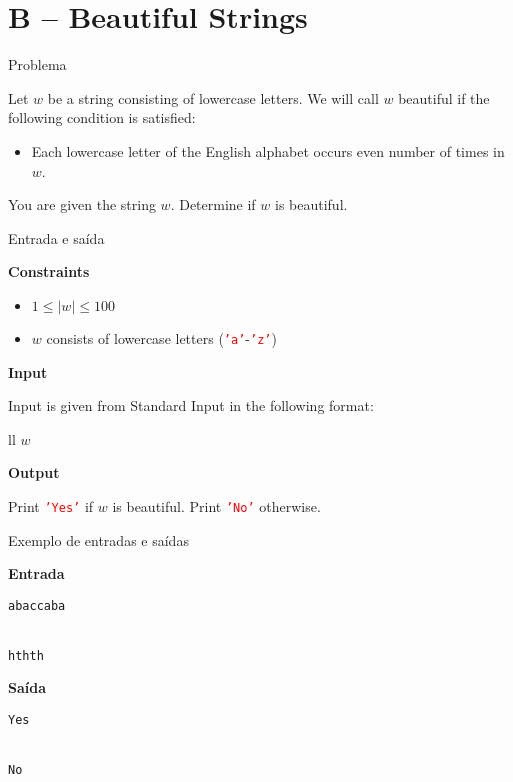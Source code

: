 \section{B -- Beautiful Strings}

\begin{frame}[fragile]{Problema}

Let $w$ be a string consisting of lowercase letters. We will call $w$ beautiful if the following
condition is satisfied:

\begin{itemize}
    \item Each lowercase letter of the English alphabet occurs even number of times in $w$.
\end{itemize}

You are given the string $w$. Determine if $w$ is beautiful.

\end{frame}

\begin{frame}[fragile]{Entrada e saída}

\textbf{Constraints}

\begin{itemize}
    \item $1\leq |w|\leq 100$
    \item $w$ consists of lowercase letters
        (\texttt{\textcolor{red}{'a'}}-\texttt{\textcolor{red}{'z'}}) 
\end{itemize}

\textbf{Input}

Input is given from Standard Input in the following format:
\begin{atcoderio}{ll}
$w$\\
\end{atcoderio}

\textbf{Output}

Print \texttt{\textcolor{red}{'Yes'}} if $w$ is beautiful. Print \texttt{\textcolor{red}{'No'}}
otherwise.

\end{frame}

\begin{frame}[fragile]{Exemplo de entradas e saídas}

\begin{minipage}[t]{0.45\textwidth}
\textbf{Entrada}
\begin{verbatim}
abaccaba


hthth
\end{verbatim}
\end{minipage}
\begin{minipage}[t]{0.5\textwidth}
\textbf{Saída}
\begin{verbatim}
Yes


No
\end{verbatim}
\end{minipage}
\end{frame}

